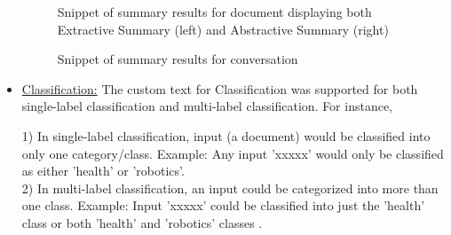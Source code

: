 \begin{itemize}
\begin {figure}[h!h]
        \caption{Snippet of summary results for document displaying both Extractive Summary (left) and Abstractive Summary (right)}
        \label{summzresp}
    \end {figure}
    \begin {figure}[h!h]
        \centering
        \caption{Snippet of summary results for conversation}
        \label{summzresp2}
    \end {figure}
    \clearpage
    \newpage
    \item \uline{Classification:} The custom text for Classification was supported for both single-label classification and multi-label classification. For instance, 
    
    1) In single-label classification, input (a document) would be classified into only one category/class. Example: Any input 'xxxxx' would only be classified as either 'health' or 'robotics'. \\
    2) In multi-label classification, an input could be categorized into more than one class. Example: Input 'xxxxx' could be classified into just the 'health' class or both 'health' and 'robotics' classes \cite{azcustomtextclassification}.
    

\end{itemize}
